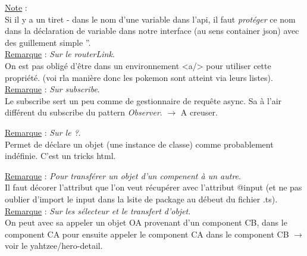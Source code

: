 \documentclass[a4paper,12pt,twoside]{article}
\newcommand{\incode}[1]{{\footnotesize\ttfamily #1}} %
\newcommand{\rem}[2]{\noindent\underline{Remarque} : \textit{#1}.\\ \indent #2}
\newcommand{\note}[1]{\noindent\underline{Note} : \\ \indent #1}
\begin{document}
\note{Si il y a un tiret - dans le nom d'une variable dans l'api, il faut \textit{protéger} ce nom dans la déclaration de variable dans notre interface (au sens container json) avec des guillement simple ''.}\\

\rem{Sur le routerLink}{On est pas obligé d'être dans un environnement <a/> pour utiliser cette propriété. (voi rla manière donc les pokemon sont atteint via leurs listes).}\\

\rem{Sur \incode{subscribe}}{Le \incode{subscribe} sert un peu comme de gestionnaire de requête async. Sa à l'air différent du subscribe du pattern \textit{Observer}. $\to$ A creuser.}\

\rem{Sur le \incode{?}}{Permet de déclare un objet (une instance de classe) comme probablement indéfinie. C'est un tricks html.}

\rem{Pour transférer un objet d'un compenent à un autre}{Il faut décorer l'attribut que l'on veut récupérer avec l'attribut  \incode{@input} (et ne pas oublier d'import le input dans la lsite de package au débeut du fichier .ts).}\\

\rem{Sur les sélecteur et le transfert d'objet}{On peut avec sa appeler un objet OA provenant d'un component CB, dans le component CA pour ensuite appeler le component CA dans le component CB $\to$ voir le yahtzee/hero-detail.}\\




\end{document}
